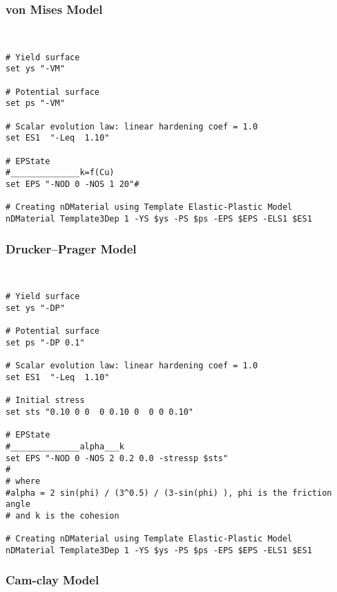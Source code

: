 \subsubsection{von Mises Model} \

\begin{small}
\begin{verbatim}
# Yield surface 
set ys "-VM"

# Potential surface
set ps "-VM"

# Scalar evolution law: linear hardening coef = 1.0
set ES1  "-Leq  1.10"

# EPState
#______________k=f(Cu)
set EPS "-NOD 0 -NOS 1 20"#

# Creating nDMaterial using Template Elastic-Plastic Model
nDMaterial Template3Dep 1 -YS $ys -PS $ps -EPS $EPS -ELS1 $ES1

\end{verbatim}
\end{small}


\subsubsection{Drucker--Prager Model} \

\begin{small}
\begin{verbatim}
# Yield surface 
set ys "-DP"

# Potential surface
set ps "-DP 0.1"

# Scalar evolution law: linear hardening coef = 1.0
set ES1  "-Leq  1.10"

# Initial stress
set sts "0.10 0 0  0 0.10 0  0 0 0.10"

# EPState
#______________alpha___k
set EPS "-NOD 0 -NOS 2 0.2 0.0 -stressp $sts"
#
# where
#alpha = 2 sin(phi) / (3^0.5) / (3-sin(phi) ), phi is the friction angle
# and k is the cohesion

# Creating nDMaterial using Template Elastic-Plastic Model
nDMaterial Template3Dep 1 -YS $ys -PS $ps -EPS $EPS -ELS1 $ES1

\end{verbatim}
\end{small}



\subsubsection{Cam-clay Model} \

